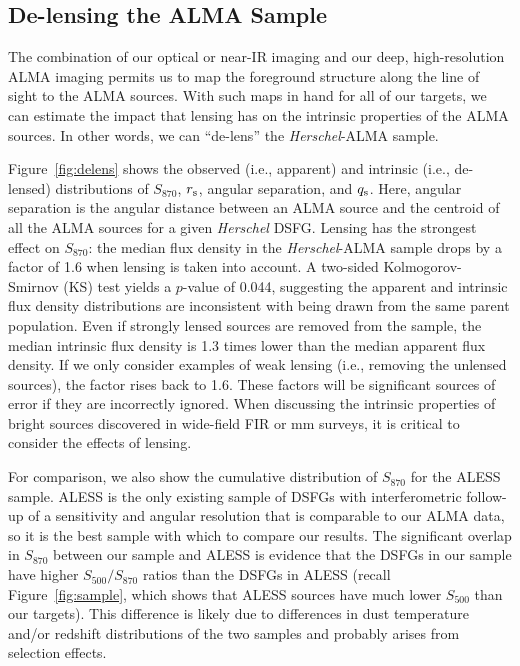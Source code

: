 \documentclass[iop]{emulateapj}
\begin{document}
\subsection{De-lensing the ALMA Sample}\label{sec:lensing}

The combination of our optical or near-IR imaging and our deep, high-resolution
ALMA imaging permits us to map the foreground structure along the line of sight
to the ALMA sources.  With such maps in hand for all of our targets, we can
estimate the impact that lensing has on the intrinsic properties of the ALMA
sources.  In other words, we can ``de-lens'' the {\it Herschel}-ALMA sample.

Figure~\ref{fig:delens} shows the observed (i.e., apparent) and intrinsic
(i.e., de-lensed) distributions of $S_{870}$, $r_{\rm s}$, angular separation,
and $q_{\rm s}$.  Here, angular separation is the angular distance between an
ALMA source and the centroid of all the ALMA sources for a given {\it Herschel}
DSFG.  Lensing has the strongest effect on $S_{870}$: the median flux density
in the {\it Herschel}-ALMA sample drops by a factor of 1.6 when lensing is
taken into account. A two-sided Kolmogorov-Smirnov (KS) test yields a $p$-value
of 0.044, suggesting the apparent and intrinsic flux density distributions are
inconsistent with being drawn from the same parent population.  Even if
strongly lensed sources are removed from the sample, the median intrinsic flux
density is 1.3 times lower than the median apparent flux density.  If we only
consider examples of weak lensing (i.e., removing the unlensed sources), the
factor rises back to 1.6.  These factors will be significant sources of error
if they are incorrectly ignored.  When discussing the intrinsic properties of
bright sources \citep[including their luminosity functions,
e.g.][]{Wyithe:2011rm} discovered in wide-field FIR or mm surveys, it is
critical to consider the effects of lensing.

For comparison, we also show the cumulative distribution of $S_{870}$ for the
ALESS sample.  ALESS is the only existing sample of DSFGs with interferometric
follow-up of a sensitivity and angular resolution that is comparable to our
ALMA data, so it is the best sample with which to compare our results.  The
significant overlap in $S_{870}$ between our sample and ALESS is evidence that
the DSFGs in our sample have higher $S_{500}/S_{870}$ ratios than the DSFGs in
ALESS (recall Figure~\ref{fig:sample}, which shows that ALESS sources have much
lower $S_{500}$ than our targets).  This difference is likely due to
differences in dust temperature and/or redshift distributions of the two
samples and probably arises from selection effects.
\end{document}
